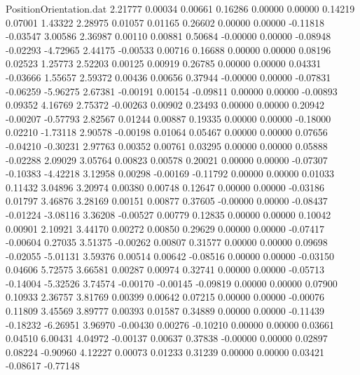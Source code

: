 \begin{filecontents}{PositionOrientation.dat}
   2.21777    0.00034    0.00661     0.16286    0.00000    0.00000    0.14219    0.07001    1.43322
   2.28975    0.01057    0.01165     0.26602    0.00000    0.00000   -0.11818   -0.03547    3.00586
   2.36987    0.00110    0.00881     0.50684   -0.00000    0.00000   -0.08948   -0.02293   -4.72965
   2.44175   -0.00533    0.00716     0.16688    0.00000    0.00000    0.08196    0.02523    1.25773
   2.52203    0.00125    0.00919     0.26785    0.00000    0.00000    0.04331   -0.03666    1.55657
   2.59372    0.00436    0.00656     0.37944   -0.00000    0.00000   -0.07831   -0.06259   -5.96275
   2.67381   -0.00191    0.00154    -0.09811    0.00000    0.00000   -0.00893    0.09352    4.16769
   2.75372   -0.00263    0.00902     0.23493    0.00000    0.00000    0.20942   -0.00207   -0.57793
   2.82567    0.01244    0.00887     0.19335    0.00000    0.00000   -0.18000    0.02210   -1.73118
   2.90578   -0.00198    0.01064     0.05467    0.00000    0.00000    0.07656   -0.04210   -0.30231
   2.97763    0.00352    0.00761     0.03295    0.00000    0.00000    0.05888   -0.02288    2.09029
   3.05764    0.00823    0.00578     0.20021    0.00000    0.00000   -0.07307   -0.10383   -4.42218
   3.12958    0.00298   -0.00169    -0.11792    0.00000    0.00000    0.01033    0.11432    3.04896
   3.20974    0.00380    0.00748     0.12647    0.00000    0.00000   -0.03186    0.01797    3.46876
   3.28169    0.00151    0.00877     0.37605   -0.00000    0.00000   -0.08437   -0.01224   -3.08116
   3.36208   -0.00527    0.00779     0.12835    0.00000    0.00000    0.10042    0.00901    2.10921
   3.44170    0.00272    0.00850     0.29629    0.00000    0.00000   -0.07417   -0.00604    0.27035
   3.51375   -0.00262    0.00807     0.31577    0.00000    0.00000    0.09698   -0.02055   -5.01131
   3.59376    0.00514    0.00642    -0.08516    0.00000    0.00000   -0.03150    0.04606    5.72575
   3.66581    0.00287    0.00974     0.32741    0.00000    0.00000   -0.05713   -0.14004   -5.32526
   3.74574   -0.00170   -0.00145    -0.09819    0.00000    0.00000    0.07900    0.10933    2.36757
   3.81769    0.00399    0.00642     0.07215    0.00000    0.00000   -0.00076    0.11809    3.45569
   3.89777    0.00393    0.01587     0.34889    0.00000    0.00000   -0.11439   -0.18232   -6.26951
   3.96970   -0.00430    0.00276    -0.10210    0.00000    0.00000    0.03661    0.04510    6.00431
   4.04972   -0.00137    0.00637     0.37838   -0.00000    0.00000    0.02897    0.08224   -0.90960
   4.12227    0.00073    0.01233     0.31239    0.00000    0.00000    0.03421   -0.08617   -0.77148

\end{filecontents}
